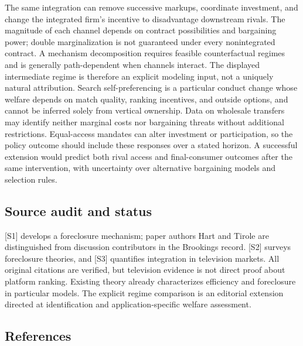 \documentclass[11pt,a4paper]{article}
\begin{document}
The same integration can remove successive markups, coordinate investment, and change the integrated firm's incentive to disadvantage downstream rivals. The magnitude of each channel depends on contract possibilities and bargaining power; double marginalization is not guaranteed under every nonintegrated contract. A mechanism decomposition requires feasible counterfactual regimes and is generally path-dependent when channels interact. The displayed intermediate regime is therefore an explicit modeling input, not a uniquely natural attribution. Search self-preferencing is a particular conduct change whose welfare depends on match quality, ranking incentives, and outside options, and cannot be inferred solely from vertical ownership. Data on wholesale transfers may identify neither marginal costs nor bargaining threats without additional restrictions. Equal-access mandates can alter investment or participation, so the policy outcome should include these responses over a stated horizon. A successful extension would predict both rival access and final-consumer outcomes after the same intervention, with uncertainty over alternative bargaining models and selection rules.

\subsection*{Source audit and status}

[S1] develops a foreclosure mechanism; paper authors Hart and Tirole are distinguished from discussion contributors in the Brookings record. [S2] surveys foreclosure theories, and [S3] quantifies integration in television markets. All original citations are verified, but television evidence is not direct proof about platform ranking. Existing theory already characterizes efficiency and foreclosure in particular models. The explicit regime comparison is an editorial extension directed at identification and application-specific welfare assessment.

\subsection*{References}
\end{document}
